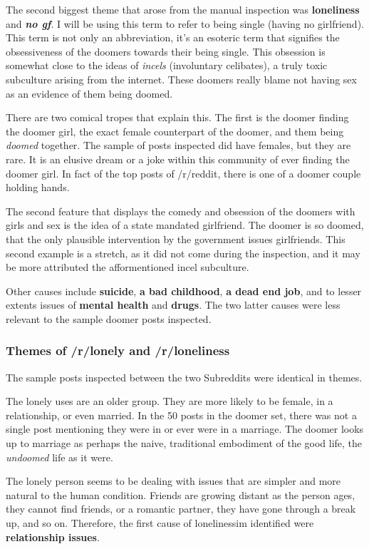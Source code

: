 \documentclass[../report.tex]{subfiles}
\begin{document}
The second biggest theme that arose from the manual inspection was \textbf{loneliness} and \textbf{\textit{no gf}}. 
I will be using this term to refer to being single (having no girlfriend).
This term is not only an abbreviation, it's an esoteric term that signifies the obsessiveness of the doomers towards their being single.
This obsession is somewhat close to the ideas of \textit{incels} (involuntary celibates), a truly toxic subculture arising from the internet. 
These doomers really blame not having sex as an evidence of them being doomed. 

There are two comical tropes that explain this. 
The first is the doomer finding the doomer girl, the exact female counterpart of the doomer, and them being \textit{doomed} together. 
The sample of posts inspected did have females, but they are rare. 
It is an elusive dream or a joke within this community of ever finding the doomer girl. 
In fact of the top posts of /r/reddit, there is one of a doomer couple holding hands. 

The second feature that displays the comedy and obsession of the doomers with girls and sex is the idea of a state mandated girlfriend. 
The doomer is so doomed, that the only plausible intervention by the government issues girlfriends. 
This second example is a stretch, as it did not come during the inspection, and it may be more attributed the afformentioned incel subculture. 

Other causes include \textbf{suicide}, \textbf{a bad childhood}, \textbf{a dead end job}, and to lesser extents issues of \textbf{mental health} and \textbf{drugs}. The two latter causes were less relevant to the sample doomer posts inspected.

\subsubsection{Themes of /r/lonely and /r/loneliness}
The sample posts inspected between the two Subreddits were identical in themes. 


The lonely uses are an older group.
They are more likely to be female, in a relationship, or even married.
In the 50 posts in the doomer set, there was not a single post mentioning they were in or ever were in a marriage. 
The doomer looks up to marriage as perhaps the naive, traditional embodiment of the good life, the \textit{undoomed} life as it were. 

The lonely person seems to be dealing with issues that are simpler and more natural to the human condition. 
Friends are growing distant as the person ages, they cannot find friends, or a romantic partner, they have gone through a break up, and so on. 
Therefore, the first cause of lonelinessim identified were \textbf{relationship issues}.
\end{document}
